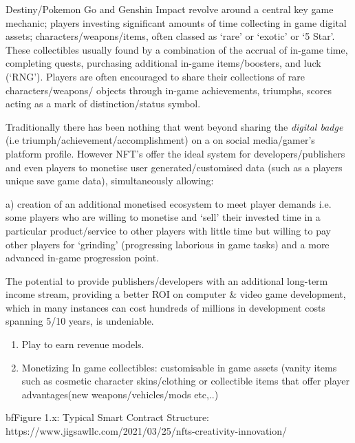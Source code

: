 Destiny/Pokemon Go and Genshin Impact revolve around a central key game
mechanic; players investing significant amounts of time collecting in
game digital assets; characters/weapons/items, often classed as `rare'
or `exotic' or `5 Star'. These collectibles usually found by a
combination of the accrual of in-game time, completing quests,
purchasing additional in-game items/boosters, and luck (`RNG'). Players
are often encouraged to share their collections of rare
characters/weapons/ objects through in-game achievements, triumphs,
scores acting as a mark of distinction/status symbol.

Traditionally there has been nothing that went beyond sharing the
\emph{digital badge} (i.e triumph/achievement/accomplishment) on a on
social media/gamer's platform profile. However NFT's offer the ideal
system for developers/publishers and even players to monetise user
generated/customised data (such as a players unique save game data),
simultaneously allowing:

a) creation of an additional monetised ecosystem to meet player demands
i.e. some players who are willing to monetise and `sell' their invested
time in a particular product/service to other players with little time
but willing to pay other players for `grinding' (progressing laborious
in game tasks) and a more advanced in-game progression point.

The potential to provide publishers/developers with an additional
long-term income stream, providing a better ROI on computer \& video
game development, which in many instances can cost hundreds of millions
in development costs spanning 5/10 years, is undeniable.

\begin{enumerate}
\def\labelenumi{\alph{enumi}.}
\setcounter{enumi}{2}
\item
  Play to earn revenue models.
\item
  Monetizing In game collectibles: customisable in game assets (vanity
  items such as cosmetic character skins/clothing or collectible items
  that offer player advantages(new weapons/vehicles/mods etc,..)
\end{enumerate}

bf{Figure 1.x:} Typical Smart Contract Structure:
https://www.jigsawllc.com/2021/03/25/nfts-creativity-innovation/
